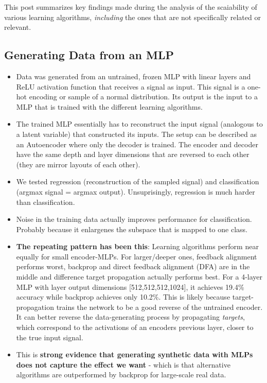 \documentclass[11pt]{article}
\begin{document}
This post summarizes key findings made during the analysis of the scaiability of various learning algorithms, \emph{including} the ones that are not specifically related or relevant.

\subsection{Generating Data from an MLP}\label{generating-data-from-an-mlp}

\begin{itemize}
\tightlist
\item
  Data was generated from an untrained, frozen MLP with linear layers and ReLU activation function that receives a signal as input. This signal is a one-hot encoding or sample of a normal distribution. Its output is the input to a MLP that is trained with the different learning algorithms.
\item
  The trained MLP essentially has to reconstruct the input signal (analogous to a latent variable) that constructed its inputs. The setup can be described as an Autoencoder where only the decoder is trained. The encoder and decoder have the same depth and layer dimensions that are reversed to each other (they are mirror layouts of each other).
\item
  We tested regression (reconstruction of the sampled signal) and classification (argmax signal = argmax output). Unsuprisingly, regression is much harder than classification.
\item
  Noise in the training data actually improves performance for classification. Probably because it enlargenes the subspace that is mapped to one class.
\item
  \textbf{The repeating pattern has been this}: Learning algorithms perform near equally for small encoder-MLPs. For larger/deeper ones, feedback alignment performs worst, backprop and direct feedback alignment (DFA) are in the middle and difference target propagation actually performs best. For a 4-layer MLP with layer output dimensions {[}512,512,512,1024{]}, it achieves 19.4\% accuracy while backprop achieves only 10.2\%. This is likely because target-propagation trains the network to be a good reverse of the untrained encoder. It can better reverse the data-generating process by propagating \emph{targets}, which correspond to the activations of an encoders previous layer, closer to the true input signal.
\item
  This is \textbf{strong evidence that generating synthetic data with MLPs does not capture the effect we want} - which is that alternative algorithms are outperformed by backprop for large-scale real data.
\end{itemize}
\end{document}
